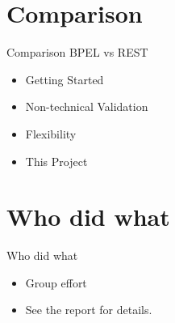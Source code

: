

\section{Comparison}
\begin{frame}{Comparison BPEL vs REST}
\begin{itemize}
\item Getting Started
\item Non-technical Validation
\item Flexibility
\item This Project
\end{itemize}
\end{frame}


\section{Who did what}
\begin{frame}{Who did what}
\begin{itemize}
	\item Group effort
	\item See the report for details.
\end{itemize}
\end{frame}


